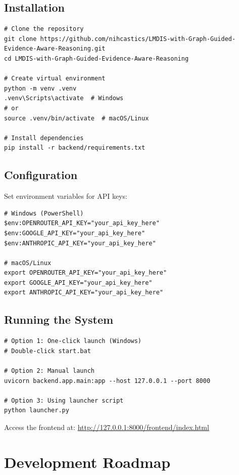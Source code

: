\documentclass[11pt,a4paper]{article}
\begin{document}
\subsection{Installation}

\begin{verbatim}
# Clone the repository
git clone https://github.com/nihcastics/LMDIS-with-Graph-Guided-Evidence-Aware-Reasoning.git
cd LMDIS-with-Graph-Guided-Evidence-Aware-Reasoning

# Create virtual environment
python -m venv .venv
.venv\Scripts\activate  # Windows
# or
source .venv/bin/activate  # macOS/Linux

# Install dependencies
pip install -r backend/requirements.txt
\end{verbatim}

\subsection{Configuration}

Set environment variables for API keys:

\begin{verbatim}
# Windows (PowerShell)
$env:OPENROUTER_API_KEY="your_api_key_here"
$env:GOOGLE_API_KEY="your_api_key_here"
$env:ANTHROPIC_API_KEY="your_api_key_here"

# macOS/Linux
export OPENROUTER_API_KEY="your_api_key_here"
export GOOGLE_API_KEY="your_api_key_here"
export ANTHROPIC_API_KEY="your_api_key_here"
\end{verbatim}

\subsection{Running the System}

\begin{verbatim}
# Option 1: One-click launch (Windows)
# Double-click start.bat

# Option 2: Manual launch
uvicorn backend.app.main:app --host 127.0.0.1 --port 8000

# Option 3: Using launcher script
python launcher.py
\end{verbatim}

Access the frontend at: \url{http://127.0.0.1:8000/frontend/index.html}

\clearpage
\section{Development Roadmap}
\end{document}
